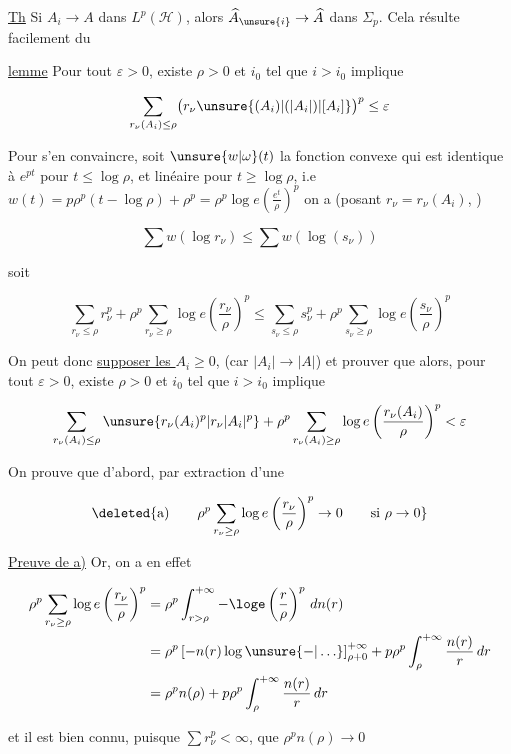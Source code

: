 
\uline{Th} Si $A_i\to A$ dans $L^p(\mathscr H)$, alors $\widehat A_{\unsure{i}}\to\widehat A$ dans $\Sigma_p$. Cela résulte facilement du

\uline{lemme} Pour tout $\varepsilon>0$, existe $\rho>0$ et $i_0$ tel que $i>i_0$ implique

\[
\sum_{r_\nu(A_i)\leq\rho}\bigl(r_\nu\unsure{(A_i)|(\lvert A_i\rvert)|[A_i]}\bigr)^p\leq\varepsilon
\]

Pour s'en convaincre, soit $\unsure{w|\omega}(t)$ la fonction convexe qui est identique à $e^{pt}$ pour $t\leq\log\rho$, et linéaire pour $t\geq\log\rho$, i.e $w(t)=p\rho^p(t-\log\rho)+\rho^p=\rho^p\log e\left(\frac{e^t}{\rho}\right)^p$ on a (posant $r_\nu=r_\nu(A_i)$, )


\[
\sum w(\log r_\nu)\leq\sum w(\log(s_\nu))
\]

soit

\[
\sum_{r_\nu\leq\rho}r_\nu^p+\rho^p\sum_{r_\nu\geq\rho}\log e\left(\frac{r_\nu}{\rho}\right)^p
\leq\sum_{s_\nu\leq\rho}s_\nu^p+\rho^p\sum_{s_\nu\geq\rho}\log e\left(\frac{s_\nu}{\rho}\right)^p
\]

On peut donc \uline{supposer les $A_i\geq0$}, (car $|A_i|\to|A|$) et prouver que alors, pour tout $\varepsilon>0$, existe $\rho>0$ et $i_0$ tel que $i>i_0$ implique

\[
\sum_{r_\nu(A_i)\leq\rho}\unsure{r_\nu(A_i)^p|r_\nu\lvert A_i\rvert^p}
+\rho^p\sum_{r_\nu(A_i)\geq\rho}\log e\left(\frac{r_\nu(A_i)}{\rho}\right)^p<\varepsilon
\]

On prouve que d'abord, par extraction d'une 


\[
\deleted{\text{a)}\qquad\rho^p\sum_{r_\nu\geq\rho}\log e\left(\frac{r_\nu}{\rho}\right)^p\to0\qquad\text{si }\rho\to0}
\]

 

\uline{Preuve de a)} Or, on a en effet

\[
\begin{aligned}
\rho^p\sum_{r_\nu\geq\rho}\log e\left(\frac{r_\nu}{\rho}\right)^p
&=\rho^p\int_{r>\rho}^{+\infty}-\loge\left(\frac{r}{\rho}\right)^p\,dn(r)\\
&=\rho^p\left[-n(r)\log\unsure{-|\ldots}\right]_{\rho+0}^{+\infty}
+p\rho^p\int_\rho^{+\infty}\frac{n(r)}{r}\,dr\\
&=\rho^p n(\rho)+p\rho^p\int_\rho^{+\infty}\frac{n(r)}{r}\,dr
\end{aligned}
\]

et il est bien connu, puisque $\sum r_\nu^p<\infty$, que $\rho^p n(\rho)\to0$

